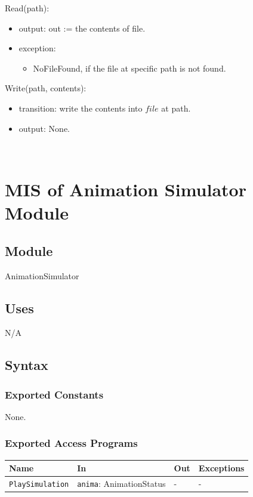 \documentclass[12pt, titlepage]{article}
\begin{document}
\noindent Read(path):
\begin{itemize}
\item output: out := the contents of file.
\item exception: 
\begin{itemize}
    \item NoFileFound, if the file at specific path is not found.
\end{itemize}
\end{itemize}

\noindent Write(path, contents):
\begin{itemize}
\item transition: write the contents into $file$ at path.
\item output: None.
\end{itemize}

~\newpage

\section{MIS of Animation Simulator Module} \label{mAnima}

\subsection{Module}

AnimationSimulator

\subsection{Uses}

N/A

\subsection{Syntax}

\subsubsection{Exported Constants}

None.

\subsubsection{Exported Access Programs}

\begin{center}
\begin{tabular}{p{4cm} p{4cm} p{4cm} p{2cm}}
\hline
\textbf{Name} & \textbf{In} & \textbf{Out} & \textbf{Exceptions} \\
\hline
\texttt{PlaySimulation} & \texttt{anima}: AnimationStatus & - & - \\
\hline
\end{tabular}
\end{center}
\end{document}

